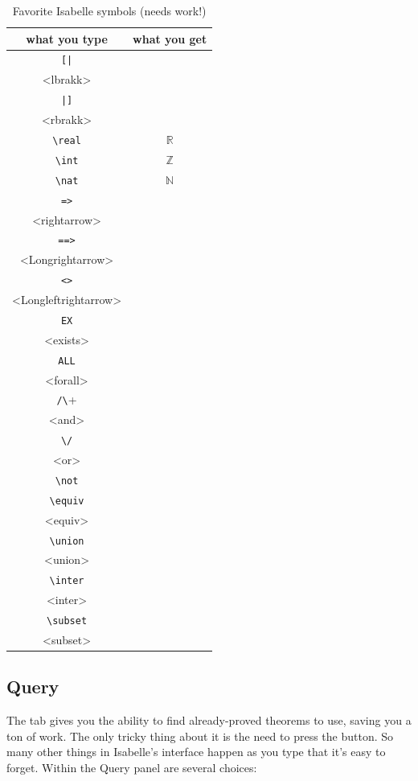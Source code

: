 \begin{longtable}{cc}
\caption{Favorite Isabelle symbols (needs work!)}\\
what you type & what you get \\ \hline
  \verb+[|+   & \isi{\\<lbrakk>} \\
  \verb+|]+  & \isi{\\<rbrakk>} \\

  \verb+\real+ &$\mathbb R$\\
  \verb+\int+  &$\mathbb Z$\\
  \verb+\nat+  &$\mathbb N$\\

  \verb+=>+  &\isi{\\<rightarrow>} \\
  \verb+==>+  &\isi{\\<Longrightarrow>} \\
  \verb+<>+   &\isi{\\<Longleftrightarrow>}\\

  \verb+EX+    &\isi{\\<exists>}\\
  \verb+ALL+   &\isi{\\<forall>}\\
  \verb+/\+    &\isi{\\<and>}\\
  \verb+\/+    &\isi{\\<or>}\\
  \verb+\not+  &\isi{¬}\\

  \verb+\equiv+ &\isi{\\<equiv>}\\
  \verb+\union+ &\isi{\\<union>}\\
  \verb+\inter+ &\isi{\\<inter>}\\
  \verb+\subset+ &\isi{\\<subset>}
\end{longtable}

\subsection{Query}
The  tab gives you the ability to find already-proved theorems to use, saving you a ton of work. The only tricky thing about it is the need to press the  button. So many other things in Isabelle's interface happen as you type that it's easy to forget. Within the Query panel are several choices:

